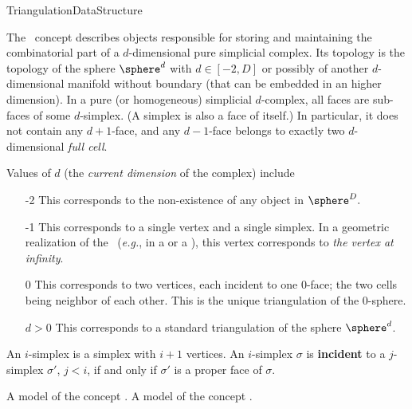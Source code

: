 \begin{ccRefConcept}{TriangulationDataStructure}

\ccDefinition

The \ccRefName\ concept describes objects responsible for storing and
maintaining the combinatorial part of a
$d$-dimensional pure simplicial complex. Its topology is the topology
of the sphere  $\sphere^d$ with $d\in[-2,D]$
or possibly of another $d$-dimensional manifold without boundary 
(that can be embedded in an higher dimension).
 In a  pure (or homogeneous) simplicial $d$-complex, all
 faces are sub-faces of some $d$-simplex. (A
simplex is also a face of itself.) In particular, it does not
contain any $d+1$-face, and any $d-1$-face belongs to exactly
two $d$-dimensional {\em full cell}. 

Values of $d$ (the \emph{current dimension} of the complex) include \begin{itemize}

\item[-2] This corresponds to the non-existence of any object in
$\sphere^D.$

\item[-1] This corresponds to a single vertex and a single simplex. In a
geometric realization of the \ccRefName\ (\emph{e.g.}, in a
 or a
), this vertex
corresponds to \emph{the vertex at infinity}.

\item[0] This corresponds to two vertices, each incident to one $0$-face;
the two cells being neighbor of each other. This is the unique
triangulation of the $0$-sphere.

\item[$d>0$] This corresponds to a standard triangulation of the sphere
$\sphere^d$.
\end{itemize}

An $i$-simplex is a simplex with $i+1$ vertices. An $i$-simplex $\sigma$ is
\textbf{incident} to a $j$-simplex $\sigma'$, $j<i$, if and only if $\sigma'$
is a proper face of $\sigma$. 

\ccHasModels


\ccTypes

{
A model of the concept .
}
\ccGlue
{}
{
A model of the concept .
}


\end{ccRefConcept}
